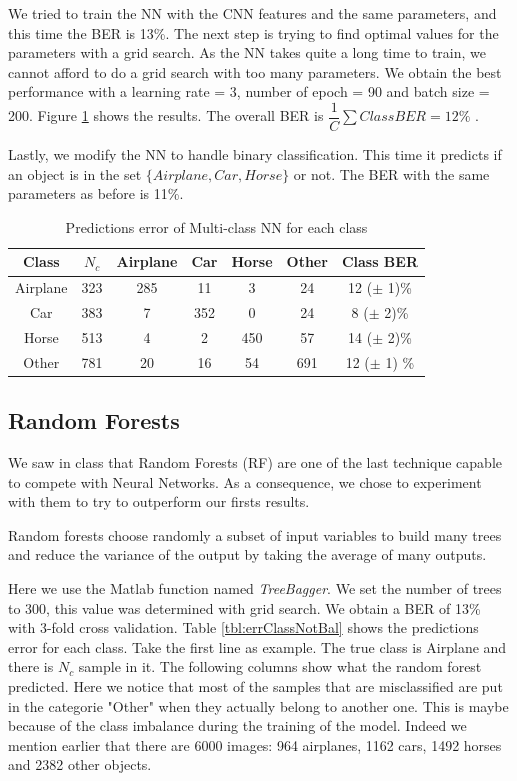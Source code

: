 \documentclass{article} %
\begin{document}
We tried to train the NN with the CNN features and the same parameters, and this time the BER is 13\%.
The next step is trying to find optimal values for the parameters with a grid search. As the NN takes quite a long time to train, we cannot afford to do a grid search with too many parameters.
We obtain the best performance with a learning rate = 3, number of epoch = 90 and batch size = 200. 
Figure \ref{tbl:errClassNN} shows the results. The overall BER is $\dfrac{1}{C}\sum Class BER= 12\%$ . 

Lastly, we modify the NN to handle binary classification. This time it predicts if an object is in the set $\{Airplane, Car, Horse\}$ or not. The BER with the same parameters as before is 11\%.

\begin{table}
	\centering
	\begin{tabular}{|c|c|c|c|c|c|c|}
		\hline Class & $N_{c}$ & Airplane & Car & Horse & Other & Class BER \\ 
		\hline Airplane	  & 323 & 285 & 11 & 3 & 24 & 12 ($\pm$ 1)\% \\ 
		\hline Car			& 383 & 7 & 352 & 0 & 24 &  8 ($\pm$ 2)\% \\ 
		\hline Horse      & 513 & 4 & 2 & 450 & 57 &  14 ($\pm$ 2)\% \\ 
		\hline Other      & 781 & 20 & 16 & 54 & 691 & 12 ($\pm$ 1) \% \\ 
		\hline 
	\end{tabular} 
	\caption{Predictions error of Multi-class NN for each class}
	\label{tbl:errClassNN}
\end{table}

\subsection{Random Forests}
We saw in class that Random Forests (RF) are one of the last technique capable to compete with Neural Networks.
As a consequence, we chose to experiment with them to try to outperform our firsts results.

Random forests choose randomly a subset of input variables to build many trees and reduce the variance of the output by taking the average of many outputs.

Here we use the Matlab function named \emph{TreeBagger}. We set the number of trees to 300, this value was determined with grid search.
We obtain a BER of 13\% with 3-fold cross validation. Table \ref{tbl:errClassNotBal} shows the predictions error for each class. Take the first line as example. The true class is Airplane and there is $N_c$ sample in it. The following columns show what the random forest predicted.
Here we notice that most of the samples that are misclassified are put in the categorie "Other" when they actually belong to another one.
This is maybe because of the class imbalance during the training of the model. Indeed we mention earlier that there are 6000 images: 964 airplanes, 1162 cars, 1492 horses and 2382 other objects.
\end{document}
